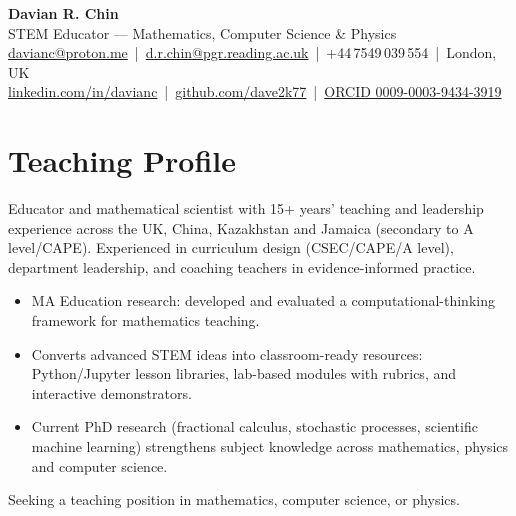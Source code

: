 \documentclass[10pt,a4paper]{article}
\begin{document}
\RaggedRight

{\Huge\bfseries\color{accent} Davian R. Chin}\\[3pt]
{\large STEM Educator --- Mathematics, Computer Science \& Physics}\\[5pt]
{\small
\href{mailto:davianc@proton.me}{davianc@proton.me} \,|\, \href{mailto:d.r.chin@pgr.reading.ac.uk}{d.r.chin@pgr.reading.ac.uk} \,|\, +44\,7549\,039\,554 \,|\, London, UK\\
\href{https://www.linkedin.com/in/davianc}{linkedin.com/in/davianc} \,|\,
\href{https://github.com/dave2k77}{github.com/dave2k77} \,|\,
\href{https://orcid.org/0009-0003-9434-3919}{ORCID 0009-0003-9434-3919}}

\section{Teaching Profile}
Educator and mathematical scientist with 15+ years' teaching and leadership experience across the UK, China, Kazakhstan and Jamaica (secondary to A level/CAPE). Experienced in curriculum design (CSEC/CAPE/A level), department leadership, and coaching teachers in evidence-informed practice.

\begin{itemize}[leftmargin=1.3em,itemsep=1.5pt,topsep=2pt]
  \item MA Education research: developed and evaluated a computational-thinking framework for mathematics teaching.
  \item Converts advanced STEM ideas into classroom-ready resources: Python/Jupyter lesson libraries, lab-based modules with rubrics, and interactive demonstrators.
  \item Current PhD research (fractional calculus, stochastic processes, scientific machine learning) strengthens subject knowledge across mathematics, physics and computer science.
\end{itemize}

Seeking a teaching position in mathematics, computer science, or physics.


\end{document}
